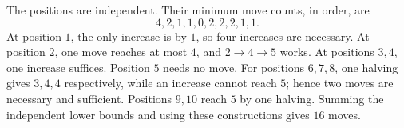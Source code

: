 The positions are independent. Their minimum move counts, in order, are
\[4,2,1,1,0,2,2,2,1,1.\]
At position $1$, the only increase is by $1$, so four increases are necessary. At position $2$, one move reaches at most $4$, and $2\to4\to5$ works. At positions $3,4$, one increase suffices. Position $5$ needs no move. For positions $6,7,8$, one halving gives $3,4,4$ respectively, while an increase cannot reach $5$; hence two moves are necessary and sufficient. Positions $9,10$ reach $5$ by one halving. Summing the independent lower bounds and using these constructions gives $\boxed{16}$ moves.

